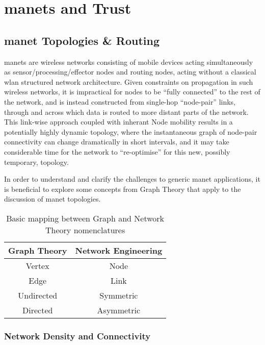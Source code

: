 \chapter{\glspl{manet} and Trust}
\label{ch:trust_background}

\section{\acrlong{manet} Topologies \& Routing}\label{sec:manet_topologies}

\glspl{manet} are wireless networks consisting of mobile devices acting simultaneously as sensor/processing/effector nodes and routing nodes, acting without a classical \gls{wlan} structured network architecture. 
Given constraints on propagation in such wireless networks, it is impractical for nodes to be ``fully connected'' to the rest of the network, and is instead constructed from single-hop ``node-pair'' links, through and across which data is routed to more distant parts of the network.
This link-wise approach coupled with inherant Node mobility results in a potentially highly dynamic topology, where the instantaneous graph of node-pair connectivity can change dramatically in short intervals, and it may take considerable time for the network to ``re-optimise'' for this new, possibly temporary, topology. 

In order to understand and clarify the challenges to generic \gls{manet} applications, it is beneficial to explore some concepts from Graph Theory that apply to the discussion of \gls{manet} topologies. 


\begin{table} 
	\centering
	\begin{tabular}{cc}
		\toprule
		Graph Theory & Network Engineering\\
		\midrule
		Vertex & Node\\
		Edge & Link\\
		Undirected & Symmetric\\
		Directed & Asymmetric\\
		\bottomrule
	\end{tabular}
	\caption{Basic mapping between Graph and Network Theory nomenclatures}
\end{table}

\subsection{Network Density and Connectivity}

